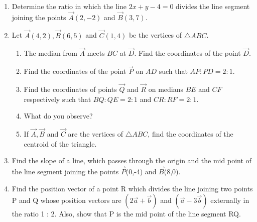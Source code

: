 \begin{enumerate}[label=\thesection.\arabic*,ref=\thesection.\theenumi]
\\
\solution
		
\item Determine the ratio in which the line $2x+y  - 4=0$ divides the line segment joining the points $\vec{A}(2, - 2)$  and  $\vec{B}(3, 7)$.
\\
\solution
	
\item Let $\vec{A}(4, 2), \vec{B}(6, 5)$  and $ \vec{C}(1, 4)$ be the vertices of $\triangle ABC$.
\begin{enumerate}
\item The median from $\vec{A}$ meets $BC$ at $\vec{D}$. Find the coordinates of the point $\vec{D}$.
\item Find the coordinates of the point $\vec{P}$ on $AD$ such that $AP : PD = 2 : 1$.
\item Find the coordinates of points $\vec{Q}$ and $\vec{R}$ on medians $BE$ and $CF$ respectively such that $BQ : QE = 2 : 1$  and  $CR : RF = 2 : 1$.
\item What do you observe?
\item If $\vec{A}, \vec{B}$ and $\vec{C}$  are the vertices of $\triangle ABC$, find the coordinates of the centroid of the triangle.
\end{enumerate}
\solution
	
\item Find the slope of a line, which passes through the origin and the mid point of the line segment joining the points $\vec{P}$(0,-4) and $\vec{B}$(8,0).
\label{chapters/11/10/1/5}

\item Find the position vector of a point R which divides the line joining two points P and Q whose position vectors are $(2\vec{a}+\vec{b})$ and $(\vec{a}-3\vec{b})$
externally in the ratio 1 : 2. Also, show that P is the mid point of the line segment RQ.\\
	\solution
%		

\end{enumerate}

